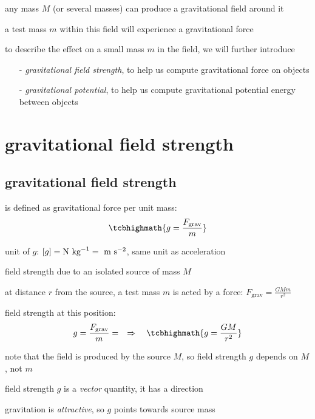 any mass $M$ (or several masses) can produce a gravitational field around it

a test mass $m$ within this field will experience a gravitational force

\vspace*{\baselineskip}

to describe the effect on a small mass $m$ in the field, we will further introduce
\begin{itemize}
	\item[-] \emph{gravitational field strength}, to help us compute gravitational force on objects
	
	\item[-] \emph{gravitational potential}, to help us compute gravitational potential energy between objects
\end{itemize}


\section{gravitational field strength}

\subsection{gravitational field strength}

\rcyskip

\begin{ilight}
	 is defined as gravitational force per unit mass: $$\tcbhighmath{g=\frac{F_\text{grav}}{m}}$$
\end{ilight}

\cmt unit of $g$: $[g]=\text{N kg}^{-1} = \text{ m s$^{-2}$}$, same unit as acceleration

\cmt field strength due to an isolated source of mass $M$

at distance $r$ from the source, a test mass $m$ is acted by a force: $F_\text{grav} = \frac{GMm}{r^2}$

field strength at this position: $$g = \frac{F_\text{grav}}{m} = \RA \tcbhighmath{g=\frac{GM}{r^2}}$$

note that the field is produced by the source $M$, so field strength $g$ depends on $M$, not $m$

\cmt field strength $g$ is a \emph{vector} quantity, it has a direction

gravitation is \emph{attractive}, so $g$ points towards source mass

